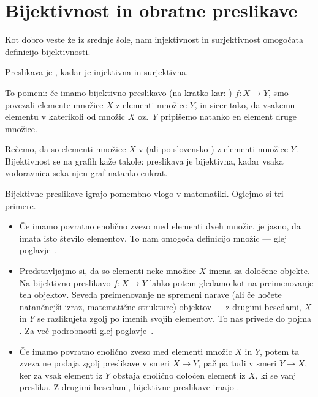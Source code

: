 

\section{Bijektivnost in obratne preslikave}\label{razdelek:bijektivnost-in-obratne-preslikave}

Kot dobro veste že iz srednje šole, nam injektivnost in surjektivnost omogočata definicijo bijektivnosti.

\begin{definicija}
Preslikava je , kadar je injektivna in surjektivna.
\end{definicija}

To pomeni: če imamo bijektivno preslikavo (na kratko kar: ) $f\colon X \to Y$, smo povezali elemente množice $X$ z elementi množice $Y$, in sicer tako, da vsakemu elementu v katerikoli od množic $X$ oz.~$Y$ pripišemo natanko en element druge množice.


Rečemo, da so elementi množice $X$ v  (ali po slovensko ) z elementi množice $Y$. Bijektivnost se na grafih kaže takole: preslikava je bijektivna, kadar vsaka vodoravnica seka njen graf natanko enkrat.

Bijektivne preslikave igrajo pomembno vlogo v matematiki. Oglejmo si tri primere.
\begin{itemize}
\item
Če imamo povratno enolično zvezo med elementi dveh množic, je jasno, da imata isto število elementov. To nam omogoča definicijo  množic --- glej poglavje~.
\item
Predstavljajmo si, da so elementi neke množice $X$ imena za določene objekte. Na bijektivno preslikavo $f\colon X \to Y$ lahko potem gledamo kot na preimenovanje teh objektov. Seveda preimenovanje ne spremeni narave (ali če hočete natančnejši izraz, matematične strukture) objektov --- z drugimi besedami, $X$ in $Y$ se razlikujeta zgolj po imenih svojih elementov. To nas privede do pojma . Za več podrobnosti glej poglavje~.
\item
Če imamo povratno enolično zvezo med elementi množic $X$ in $Y$, potem ta zveza ne podaja zgolj preslikave v smeri $X \to Y$, pač pa tudi v smeri $Y \to X$, ker za vsak element iz $Y$ obstaja enolično določen element iz $X$, ki se vanj preslika. Z drugimi besedami, bijektivne preslikave imajo .
\end{itemize}

